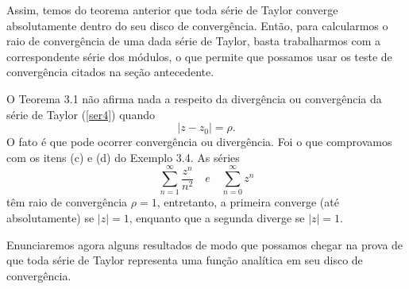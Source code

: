 Assim, temos do teorema anterior que toda série de Taylor converge absolutamente dentro do seu disco de convergência. Então, para calcularmos o raio de convergência de uma dada série de Taylor, basta trabalharmos com a correspondente série dos módulos, o que permite que possamos usar os teste de convergência citados na seção antecedente.


\begin{remark}
O Teorema 3.1 não afirma nada a respeito da divergência ou convergência da série de Taylor (\eqref{ser4}) quando
$$|z-z_0| = \rho.$$
O fato é que pode ocorrer convergência ou divergência. Foi o que comprovamos com os itens (c) e (d) do Exemplo 3.4. As séries
$$\displaystyle\sum_{n=1}^{\infty}\dfrac{z^n}{n^2} \quad e \quad \displaystyle\sum_{n=0}^{\infty}z^n$$
têm raio de convergência $\rho = 1$, entretanto, a primeira converge (até absolutamente) se $|z| = 1$, enquanto que a segunda diverge se $|z|=1$.
\end{remark}

Enunciaremos agora alguns resultados de modo que possamos chegar na prova de que toda série de Taylor representa uma função analítica em seu disco de convergência.

